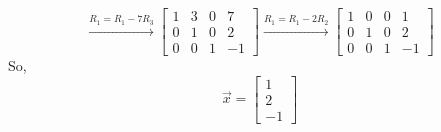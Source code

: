 \begin{equation*}
	\stackrel{R_1 = R_1 - 7R_3}{\to} \left[
		\begin{array}{ccc|c}
			1 & 3 & 0 & 7 \\
			0 & 1 & 0 & 2 \\
			0 & 0 & 1 & -1
		\end{array}
	\right] \stackrel{R_1 = R_1 - 2R_2}{\to} \left[
		\begin{array}{ccc|c}
			1 & 0 & 0 & 1 \\
			0 & 1 & 0 & 2 \\
			0 & 0 & 1 & -1
		\end{array}
	\right]
\end{equation*}
So,
\begin{equation*}
	\vec{x} = \begin{bmatrix}
		1 \\
		2 \\
		-1
	\end{bmatrix}
\end{equation*}